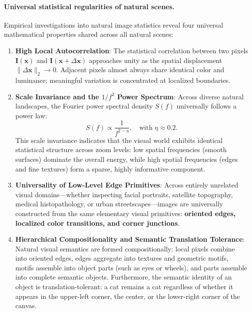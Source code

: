 \paragraph{Universal statistical regularities of natural scenes.}
Empirical investigations into natural image statistics reveal four universal mathematical properties shared across all natural scenes:
\begin{enumerate}[leftmargin=*]
  \item \textbf{High Local Autocorrelation}: The statistical correlation between two pixels $\mathbf{I}(\mathbf{x})$ and $\mathbf{I}(\mathbf{x} + \Delta \mathbf{x})$ approaches unity as the spatial displacement $\|\Delta \mathbf{x}\|_2 \to 0$. Adjacent pixels almost always share identical color and luminance; meaningful variation is concentrated at localized boundaries.
  \item \textbf{Scale Invariance and the $1/f^2$ Power Spectrum}: Across diverse natural landscapes, the Fourier power spectral density $S(f)$ universally follows a power law:
    \begin{equation}
    S(f) \propto \frac{1}{f^{2 - \eta}}, \quad \text{with } \eta \approx 0.2.
    \label{eq:power_spectrum_law}
    \end{equation}
    This scale invariance indicates that the visual world exhibits identical statistical structure across zoom levels: low spatial frequencies (smooth surfaces) dominate the overall energy, while high spatial frequencies (edges and fine textures) form a sparse, highly informative component.
  \item \textbf{Universality of Low-Level Edge Primitives}: Across entirely unrelated visual domains---whether inspecting facial portraits, satellite topography, medical histopathology, or urban streetscapes---images are universally constructed from the same elementary visual primitives: \textbf{oriented edges, localized color transitions, and corner junctions}.
  \item \textbf{Hierarchical Compositionality and Semantic Translation Tolerance}: Natural visual semantics are formed compositionally: local pixels combine into oriented edges, edges aggregate into textures and geometric motifs, motifs assemble into object parts (such as eyes or wheels), and parts assemble into complete semantic objects. Furthermore, the semantic identity of an object is translation-tolerant: a cat remains a cat regardless of whether it appears in the upper-left corner, the center, or the lower-right corner of the canvas.
\end{enumerate}

